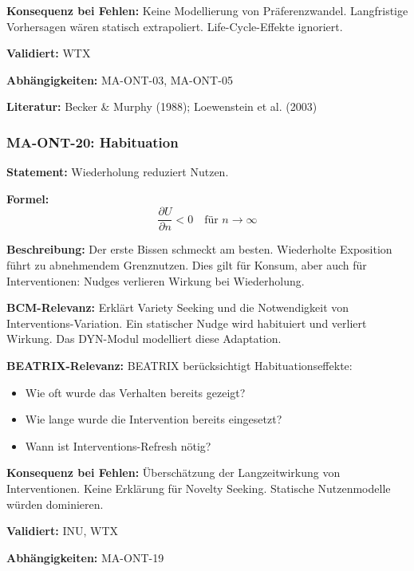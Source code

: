 \textbf{Konsequenz bei Fehlen:}
Keine Modellierung von Präferenzwandel. Langfristige Vorhersagen wären statisch extrapoliert. Life-Cycle-Effekte ignoriert.

\textbf{Validiert:} WTX

\textbf{Abhängigkeiten:} MA-ONT-03, MA-ONT-05

\textbf{Literatur:} Becker \& Murphy (1988); Loewenstein et al. (2003)


\subsubsection*{MA-ONT-20: Habituation}

\textbf{Statement:} Wiederholung reduziert Nutzen.

\textbf{Formel:}
\begin{equation}
\frac{\partial U}{\partial n} < 0 \quad \text{für } n \rightarrow \infty
\end{equation}

\textbf{Beschreibung:}
Der erste Bissen schmeckt am besten. Wiederholte Exposition führt zu abnehmendem Grenznutzen. Dies gilt für Konsum, aber auch für Interventionen: Nudges verlieren Wirkung bei Wiederholung.

\textbf{BCM-Relevanz:}
Erklärt Variety Seeking und die Notwendigkeit von Interventions-Variation. Ein statischer Nudge wird habituiert und verliert Wirkung. Das DYN-Modul modelliert diese Adaptation.

\textbf{BEATRIX-Relevanz:}
BEATRIX berücksichtigt Habituationseffekte:
\begin{itemize}
    \item Wie oft wurde das Verhalten bereits gezeigt?
    \item Wie lange wurde die Intervention bereits eingesetzt?
    \item Wann ist Interventions-Refresh nötig?
\end{itemize}

\textbf{Konsequenz bei Fehlen:}
Überschätzung der Langzeitwirkung von Interventionen. Keine Erklärung für Novelty Seeking. Statische Nutzenmodelle würden dominieren.

\textbf{Validiert:} INU, WTX

\textbf{Abhängigkeiten:} MA-ONT-19

